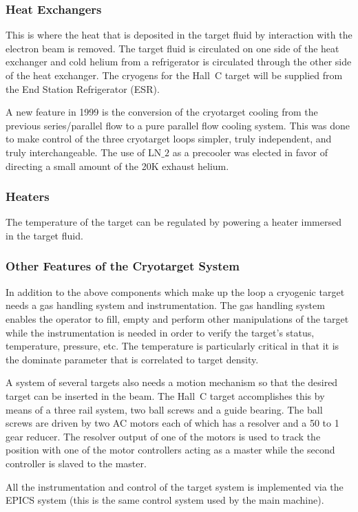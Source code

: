 \subsubsection{Heat Exchangers} This is where the heat that is deposited in the target
fluid by interaction with the electron beam is removed. The target fluid is
circulated on one side of the heat exchanger and cold helium
from a refrigerator is circulated through the other side of the heat exchanger.
The cryogens for the Hall~C target will be supplied from the End Station
Refrigerator (ESR).

A new feature in 1999 is the conversion of the cryotarget cooling from
the previous series/parallel flow to a pure parallel flow cooling
system.  This was done to make control of the three cryotarget loops
simpler, truly independent, and truly interchangeable.  The use of
LN$\_2$ as a precooler was elected in favor of directing a small
amount of the 20K exhaust helium.  

\subsubsection{Heaters} The temperature of the target can be regulated by powering
a heater immersed in the target fluid.

\subsubsection{Other Features of the Cryotarget System}  In addition to the above components which make up the loop a cryogenic target
needs a gas handling system and instrumentation. The gas handling system
enables the operator to fill, empty and perform other manipulations of the
target while the instrumentation is needed in order to verify the target's
status, temperature, pressure, etc. The temperature is particularly critical
in that it is the dominate parameter that is correlated to target density.

A system of several targets also needs a motion mechanism so that the desired
target can be inserted in the beam. The Hall~C target accomplishes this by
means of a three rail system, two ball screws and a guide bearing.
The ball screws are driven by two AC motors each of which has a resolver and
a 50 to 1 gear reducer. The resolver output of one of the motors is used
to track the position with one of the motor controllers acting as a master
while the second controller is slaved to the master.

All the instrumentation and control of the target system is implemented
via the EPICS system (this is the same control system used by the main
machine).

